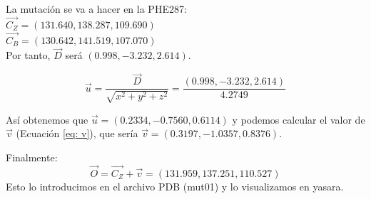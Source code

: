 \documentclass[a4paper,11pt]{report}
\begin{document}
La mutación se va a hacer en la PHE287: \\
$\vec{C_Z}= (131.640, 138.287, 109.690)$ \\
$\vec{C_B}= (130.642, 141.519, 107.070)$ \\

Por tanto, $\vec{D}$ será $(0.998, -3.232, 2.614)$.

\begin{equation}
	\vec{u} = \frac{\vec{D}}{\sqrt{x^2 + y^2 + z^2}} = \frac{(0.998, -3.232, 2.614)}{4.2749} 
\end{equation}

 Así obtenemos que $\vec{u} = (0.2334, -0.7560, 0.6114)$ y podemos calcular el valor de $\vec{v}$ (Ecuación \ref{eq: v}), que sería $\vec{v}= (0.3197, -1.0357, 0.8376)$.
 
 Finalmente:
 \begin{equation}
 	\vec{O} = \vec{C_Z} + \vec{v}= (131.959, 137.251, 110.527)
 \end{equation}
Esto lo introducimos en el archivo PDB (mut01) y lo visualizamos en yasara.
\end{document}
